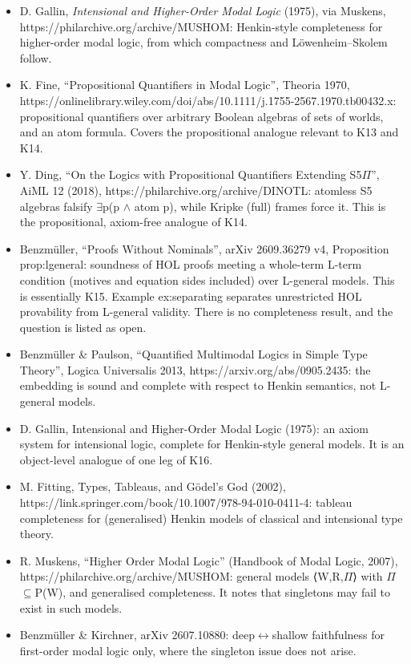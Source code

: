 \documentclass{article}
\begin{document}
\begin{itemize}
\item D. Gallin, \emph{Intensional and Higher-Order Modal Logic} (1975), via Muskens, https://philarchive.org/archive/MUSHOM: Henkin-style completeness for higher-order modal logic, from which compactness and Löwenheim--Skolem follow.
\item K. Fine, ``Propositional Quantifiers in Modal Logic'', Theoria 1970, https://onlinelibrary.wiley.com/doi/abs/10.1111/j.1755-2567.1970.tb00432.x: propositional quantifiers over arbitrary Boolean algebras of sets of worlds, and an atom formula. Covers the propositional analogue relevant to K13 and K14.
\item Y. Ding, ``On the Logics with Propositional Quantifiers Extending S5$\Pi$'', AiML 12 (2018), https://philarchive.org/archive/DINOTL: atomless S5 algebras falsify $\exists$p(p $\wedge$ atom p), while Kripke (full) frames force it. This is the propositional, axiom-free analogue of K14.
\item Benzmüller, ``Proofs Without Nominals'', arXiv 2609.36279 v4, Proposition prop:lgeneral: soundness of HOL proofs meeting a whole-term L-term condition (motives and equation sides included) over L-general models. This is essentially K15. Example ex:separating separates unrestricted HOL provability from L-general validity. There is no completeness result, and the question is listed as open.
\item Benzmüller \& Paulson, ``Quantified Multimodal Logics in Simple Type Theory'', Logica Universalis 2013, https://arxiv.org/abs/0905.2435: the embedding is sound and complete with respect to Henkin semantics, not L-general models.
\item D. Gallin, Intensional and Higher-Order Modal Logic (1975): an axiom system for intensional logic, complete for Henkin-style general models. It is an object-level analogue of one leg of K16.
\item M. Fitting, Types, Tableaus, and Gödel's God (2002), https://link.springer.com/book/10.1007/978-94-010-0411-4: tableau completeness for (generalised) Henkin models of classical and intensional type theory.
\item R. Muskens, ``Higher Order Modal Logic'' (Handbook of Modal Logic, 2007), https://philarchive.org/archive/MUSHOM: general models ⟨W,R,$\Pi$⟩ with $\Pi$$\subseteq$P(W), and generalised completeness. It notes that singletons may fail to exist in such models.
\item Benzmüller \& Kirchner, arXiv 2607.10880: deep$\leftrightarrow$shallow faithfulness for first-order modal logic only, where the singleton issue does not arise.
$$
\end{itemize}
\end{document}
